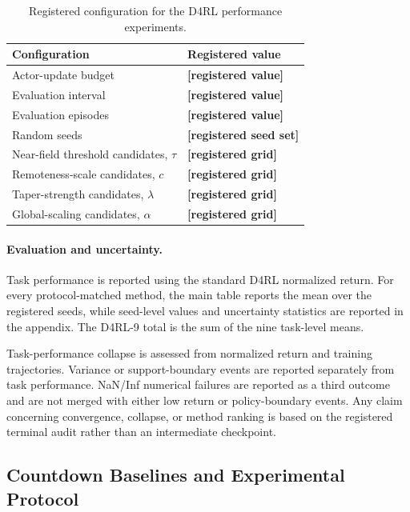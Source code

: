 \begin{table}[t]
\centering
\caption{Registered configuration for the D4RL performance experiments.}
\label{tab:d4rl_registered_config}

\small
\setlength{\tabcolsep}{8pt}
\renewcommand{\arraystretch}{1.12}

\begin{tabular}{@{}ll@{}}
\toprule
Configuration & Registered value \\
\midrule
Actor-update budget
& \textbf{[registered value]} \\
Evaluation interval
& \textbf{[registered value]} \\
Evaluation episodes
& \textbf{[registered value]} \\
Random seeds
& \textbf{[registered seed set]} \\
Near-field threshold candidates, $\tau$
& \textbf{[registered grid]} \\
Remoteness-scale candidates, $c$
& \textbf{[registered grid]} \\
Taper-strength candidates, $\lambda$
& \textbf{[registered grid]} \\
Global-scaling candidates, $\alpha$
& \textbf{[registered grid]} \\
\bottomrule
\end{tabular}
\end{table}

\paragraph{Evaluation and uncertainty.}

Task performance is reported using the standard D4RL normalized return.
For every protocol-matched method, the main table reports the mean over
the registered seeds, while seed-level values and uncertainty
statistics are reported in the appendix. The D4RL-9 total is the sum of
the nine task-level means.

Task-performance collapse is assessed from normalized return and
training trajectories. Variance or support-boundary events are reported
separately from task performance. NaN/Inf numerical failures are
reported as a third outcome and are not merged with either low return or
policy-boundary events. Any claim concerning convergence, collapse, or
method ranking is based on the registered terminal audit rather than an
intermediate checkpoint.


\subsection{Countdown Baselines and Experimental Protocol}
\label{app:countdown_methods}

